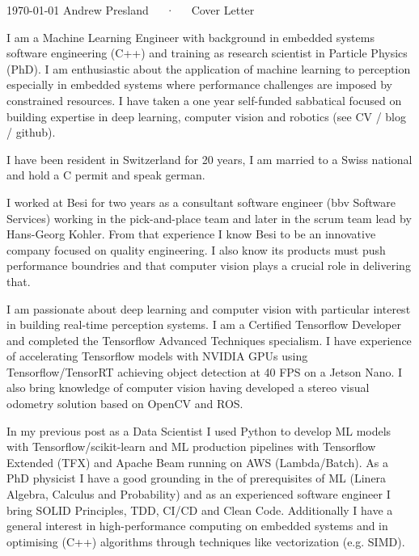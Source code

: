 \documentclass[11pt, a4paper]{awesome-cv}
\begin{document}
\makecvheader[R]

\makecvfooter
  {\today}
  {Andrew Presland~~~·~~~Cover Letter}
  {}

\makelettertitle

\begin{cvletter}

I am a Machine Learning Engineer with background in embedded systems software 
engineering (C++) and training as research scientist in Particle Physics (PhD).
I am enthusiastic about the application of machine learning to perception especially 
in embedded systems where performance challenges are imposed by constrained resources. 
I have taken a one year self-funded sabbatical focused on building expertise in deep learning, 
computer vision and robotics (see CV / blog / github). 

I have been resident in Switzerland for 20 years, I am married to a Swiss
national and hold a C permit and speak german.

I worked at Besi for two years as a consultant software engineer (bbv Software Services) 
working in the pick-and-place team and later in the scrum team lead by 
Hans-Georg Kohler. From that experience I know Besi to be an innovative company 
focused on quality engineering. I also know its products must push performance boundries 
and that computer vision plays a crucial role in delivering that.



I am passionate about deep learning and computer vision with particular interest
in building real-time perception systems. I am a Certified Tensorflow 
Developer and completed the Tensorflow Advanced Techniques specialism. 
I have experience of accelerating Tensorflow models with NVIDIA GPUs using 
Tensorflow/TensorRT achieving object detection at 40 FPS on a Jetson Nano. I also 
bring knowledge of computer vision having developed a stereo visual odometry solution 
based on OpenCV and ROS.  

In my previous post as a Data Scientist I used Python to develop ML models 
with Tensorflow/scikit-learn and ML production pipelines with Tensorflow Extended (TFX) 
and Apache Beam running on AWS (Lambda/Batch). As a PhD physicist I have a
good grounding in the of prerequisites of ML (Linera Algebra, Calculus and Probability) 
and as an experienced software engineer I bring SOLID Principles, TDD, CI/CD and 
Clean Code. Additionally I have a general interest in high-performance computing on embedded systems 
and in optimising (C++) algorithms through techniques like vectorization (e.g. SIMD).


\end{cvletter}


\makeletterclosing
\end{document}
